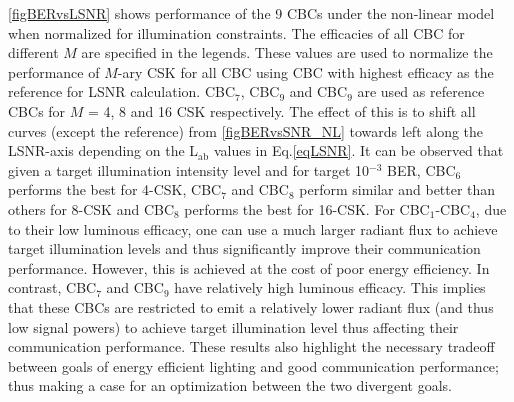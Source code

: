 \figurename{ }\ref{figBERvsLSNR} shows performance of the 9 CBCs under the non-linear model when normalized for illumination constraints. The efficacies of all CBC for different $M$ are specified in the legends. These values are used to normalize the performance of $M$-ary CSK for all CBC using CBC with highest efficacy as the reference for LSNR calculation. CBC$_{7}$, CBC$_{9}$ and CBC$_{9}$ are used as reference CBCs for $M$ = 4, 8 and 16 CSK respectively. The effect of this is to shift all curves (except the reference) from \figurename{ }\ref{figBERvsSNR_NL} towards left along the LSNR-axis depending on the L$_{\text{ab}}$ values in Eq.\eqref{eqLSNR}. It can be observed that given a target illumination intensity level and for target 10$^{-3}$ BER, CBC$_{6}$ performs the best for 4-CSK, CBC$_{7}$ and CBC$_{8}$ perform similar and better than others for 8-CSK and CBC$_{8}$ performs the best for 16-CSK. For CBC$_{1}$-CBC$_{4}$, due to their low luminous efficacy, one can use a much larger radiant flux to achieve target illumination levels and thus significantly improve their communication performance. However, this is achieved at the cost of poor energy efficiency. In contrast, CBC$_{7}$ and CBC$_{9}$ have relatively high luminous efficacy. This implies that these CBCs are restricted to emit a relatively lower radiant flux (and thus low signal powers) to achieve target illumination level thus affecting their communication performance. These results also highlight the necessary tradeoff between goals of energy efficient lighting and good communication performance; thus making a case for an optimization between the two divergent goals.
